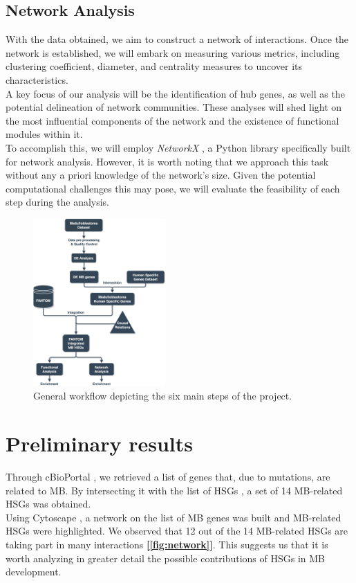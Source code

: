 \documentclass[10pt]{SelfArx} %
\begin{document}
\subsection{Network Analysis}\label{sec:network_analysis}
With the data obtained, we aim to construct a network of interactions.
Once the network is established, we will embark on measuring various metrics, including clustering coefficient, diameter, and centrality measures to uncover its characteristics. \\
A key focus of our analysis will be the identification of hub genes, as well as the potential delineation of network communities. These analyses will shed light on the most influential components of the network and the existence of functional modules within it. \\
To accomplish this, we will employ \textit{NetworkX} \cite{hagberg2008exploring}, a Python library specifically built for network analysis. However, it is worth noting that we approach this task without any a priori knowledge of the network's size. Given the potential computational challenges this may pose, we will evaluate the feasibility of each step during the analysis. 

\begin{figure}[h!]
    \centering
    \includegraphics[width=0.45\textwidth]{project-proposal/figures/workflow.png}
    \caption{General workflow depicting the six main steps of the project.}
    \label{fig:workflow}    
\end{figure}

\section{Preliminary results}\label{sec:preliminary_results}
Through cBioPortal \cite{cbioportal}, we retrieved a list of genes that, due to mutations, are related to MB. By intersecting it with the list of HSGs \cite{bitar2019genes}, a set of 14 MB-related HSGs was obtained. \\
Using Cytoscape \cite{shannon2003cytoscape}, a network on the list of MB genes was built and MB-related HSGs were highlighted. We observed that 12 out of the 14 MB-related HSGs are taking part in many interactions \textbf{[\ref{fig:network}]}. This suggests us that it is worth analyzing in greater detail the possible contributions of HSGs in MB development.
\end{document}
